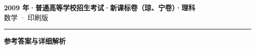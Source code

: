 \documentclass[zihao=5, a4paper]{ctexart}
\begin{document}
\begin{center}
  {\Large\bfseries 2009 年·普通高等学校招生考试·新课标卷（琼、宁卷）·理科}\\[4pt]
  {\large 数学 · 印刷版}
\end{center}
\medskip
{}

\par\bigskip\hrule\bigskip
{}
\begin{center}{\large\bfseries 参考答案与详细解析}\end{center}
\smallskip

\end{document}
